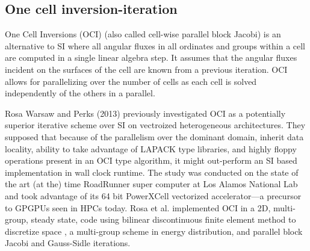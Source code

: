 \subsection{One cell inversion-iteration}


One Cell Inversions (OCI) (also called cell-wise parallel block Jacobi) is an alternative to SI where all angular fluxes in all ordinates and groups within a cell are computed in a single linear algebra step.
It assumes that the angular fluxes incident on the surfaces of the cell are known from a previous iteration.
OCI allows for parallelizing over the number of cells as each cell is solved independently of the others in a parallel.

Rosa Warsaw and Perks (2013) \cite{rosa_cellwise_2013} previously investigated OCI as a potentially superior iterative scheme over SI on vectroized heterogeneous architectures.
They supposed that because of the parallelism over the dominant domain, inherit data locality, ability to take advantage of LAPACK type libraries, and highly floppy operations present in an OCI type algorithm, it might out-perform an SI based implementation in wall clock runtime.
The study was conducted on the state of the art (at the) time RoadRunner super computer at Los Alamos National Lab and took advantage of its 64 bit PowerXCell vectorized accelerator---a precursor to GPGPUs seen in HPCs today.
Rosa et al. implemented OCI in a 2D, multi-group, steady state, code using bilinear discontinuous finite element method to discretize space \cite{tsa_2d2007rosa}, a multi-group scheme in energy distribution, and parallel block Jacobi and Gauss-Sidle iterations.

